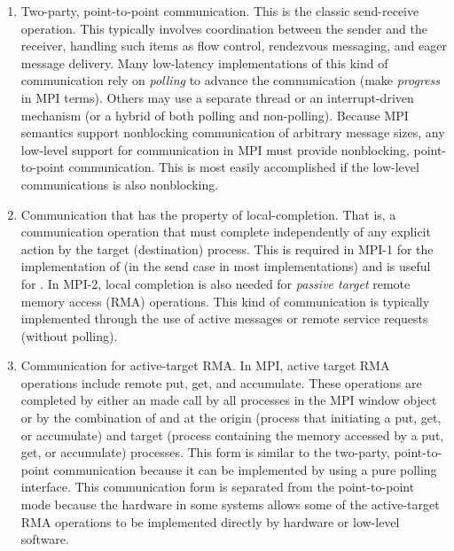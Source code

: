 \begin{enumerate}
\item Two-party, point-to-point communication.  This is the classic
send-receive operation.  This typically involves coordination between
the sender and the receiver, handling such items as flow control,
rendezvous messaging, and eager message delivery.  Many low-latency
implementations of this kind of communication rely on \emph{polling}
to advance the communication (make \emph{progress} in MPI terms).
Others may use a separate thread or an interrupt-driven mechanism (or
a hybrid of both polling and non-polling). 
Because MPI semantics support nonblocking communication of arbitrary
message sizes, any low-level support for communication in MPI must
provide nonblocking, point-to-point communication.  This is most
easily accomplished if the low-level communications is also
nonblocking.

\item Communication that has the property of local-completion. That
is, a communication operation that must complete independently of any
explicit action by the target (destination) process.  This is required
in MPI-1 for the implementation of  (in the send
case in most implementations) and is useful for .
In MPI-2, local completion is also needed for \emph{passive target}
remote memory access (RMA) operations.  This kind of communication is
typically implemented through the use of active messages or remote
service requests (without polling).

\item Communication for active-target RMA.  In MPI, active target RMA
operations include remote put, get, and accumulate.  These operations
are completed by either an  made call by all processes
in the MPI window object or by the combination of
 and  at the origin (process
that initiating a put, get, or accumulate) and target (process
containing the memory accessed by a put, get, or accumulate)
processes.  This form is similar to the two-party, point-to-point
communication because it can be implemented by using a pure polling
interface. This communication form is separated from the point-to-point
mode because the hardware in some systems allows some of the
active-target RMA operations to be implemented directly by hardware or
low-level software.


\end{enumerate}
